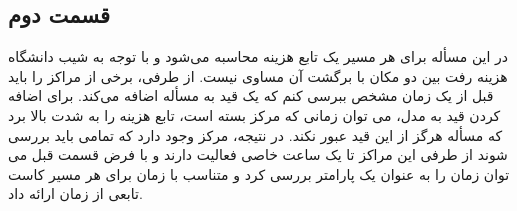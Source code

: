 \subsection{قسمت دوم}
در این مسأله برای هر مسیر یک تابع هزینه محاسبه می‌شود و با توجه به شیب دانشگاه هزینه رفت بین دو مکان با برگشت آن مساوی نیست. از طرفی، برخی از مراکز را باید قبل از یک زمان مشخص ببرسی کنم که یک قید به مسأله اضافه می‌کند. برای اضافه کردن قید به مدل، می توان زمانی که مرکز بسته است، تابع هزینه را به شدت بالا برد که مسأله هرگز از این قید عبور نکند. در نتیجه،  مرکز وجود دارد که تمامی باید بررسی شوند از طرفی این مراکز تا یک ساعت خاصی فعالیت دارند و با فرض قسمت قبل می توان زمان را به عنوان یک پارامتر بررسی کرد و متناسب با زمان برای هر مسیر کاست تابعی از زمان ارائه داد.